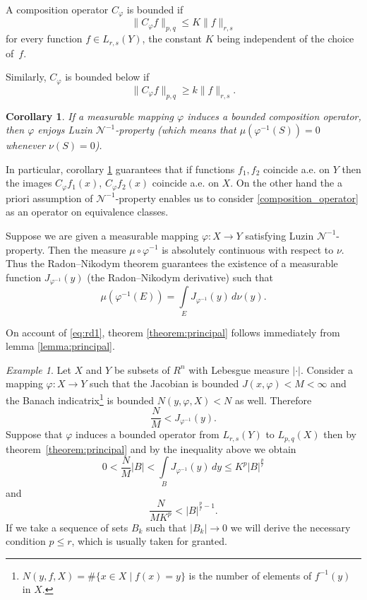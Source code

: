 \documentclass{birkjour}
\newtheorem{cor}[thm]{Corollary}
\theoremstyle{definition}
\theoremstyle{remark}
\newtheorem*{ex}{Example}
\numberwithin{equation}{section}
\begin{document}
A composition operator $C_\varphi$ is bounded if
\begin{equation}\label{eq:bounded_operator}
\|C_\varphi f\|_{p,q}\leq K\|f\|_{r,s}
\end{equation}
for every function $f\in L_{r,s}(Y)$, the constant $K$ being independent of the choice of~$f$.

Similarly, $C_\varphi$ is bounded below if
\begin{equation}\label{bounded-below}
\|C_\varphi f\|_{p,q} \geq k\|f\|_{r,s}.
\end{equation}

\begin{cor}\label{cor:LuzinN-1}
If a measurable mapping $\varphi$ induces a bounded composition operator, 
then $\varphi$ enjoys Luzin $\mathcal N^{-1}$-property 
(which means that $\mu(\varphi^{-1}(S))=0$ whenever $\nu(S)=0$).
\end{cor}
In particular, corollary \ref{cor:LuzinN-1} guarantees that if functions $f_1, f_2$ 
coincide a.e. on $Y$ then the images $C_\varphi f_1(x)$, $C_\varphi f_2(x)$
coincide a.e. on $X$.
On the other hand the a priori assumption of $\mathcal N^{-1}$-property enables us to 
consider \eqref{composition_operator} as an operator on equivalence classes.

Suppose we are given a measurable mapping $\varphi:X\to Y$
satisfying Luzin $\mathcal N^{-1}$-property. 
Then the measure $\mu\circ\varphi^{-1}$ is absolutely continuous with respect to $\nu$.
Thus the Radon--Nikodym theorem guarantees the existence of a measurable function 
$J_{\varphi^{-1}}(y)$ (the Radon--Nikodym derivative) such that
\begin{equation}\label{eq:rd1}
\mu(\varphi^{-1}(E)) = \int\limits_E J_{\varphi^{-1}}(y)\, d\nu(y).
\end{equation} 

On account of \eqref{eq:rd1}, theorem \ref{theorem:principal} follows 
immediately from lemma  \ref{lemma:principal}.

\begin{ex}
Let $X$ and $Y$ be subsets of $R^n$ with Lebesgue measure ${|\cdot|}$.
Consider a mapping  $\varphi:X\to Y$ such that the Jacobian is bounded $J(x,\varphi)<M<\infty$
and the Banach indicatrix\footnote{$N(y,f,X) = \#\{x\in X \mid f(x) = y\}$ is the number of elements of $f^{-1}(y)$ in $X$.}
is bounded $N(y,\varphi, X) < N$ as well.  
Therefore 
$$
\frac{N}{M} < J_{\varphi^{-1}}(y).
$$
Suppose that $\varphi$ induces a bounded operator from $L_{r,s}(Y)$ to $L_{p,q}(X)$
then by theorem~\ref{theorem:principal} 
and by the inequality above we obtain 
$$
0<\frac{N}{M}|B| < \int\limits_BJ_{\varphi^{-1}}(y)\, dy \leq K^p|B|^{\frac{p}{r}}
$$
and 
$$
\frac{N}{MK^p} <  |B|^{\frac{p}{r} - 1}.
$$
If we take a sequence of sets $B_k$ such that $|B_k|\to 0$ 
we will derive the necessary condition $p\leq r$, which is usually taken for granted.     
\end{ex}
\end{document}
